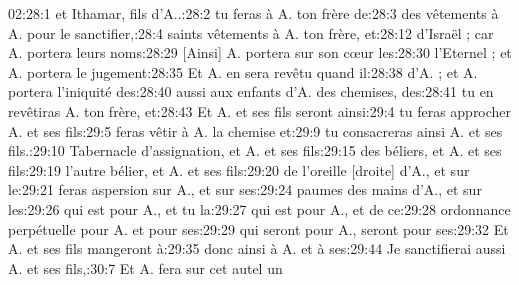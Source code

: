 \begin{multicols}{3}
{02:28:1	et Ithamar, fils d'A..:28:2	tu feras à A. ton frère de:28:3	des vêtements à A. pour le sanctifier,:28:4	saints vêtements à A. ton frère, et:28:12	d'Israël ; car A. portera leurs noms:28:29	[Ainsi] A. portera sur son cœur les:28:30	l'Eternel ; et A. portera le jugement:28:35	Et A. en sera revêtu quand il:28:38	d'A. ; et A. portera l'iniquité des:28:40	aussi aux enfants d'A. des chemises, des:28:41	tu en revêtiras A. ton frère, et:28:43	Et A. et ses fils seront ainsi:29:4	tu feras approcher A. et ses fils:29:5	feras vêtir à A. la chemise et:29:9	tu consacreras ainsi A. et ses fils.:29:10	Tabernacle d'assignation, et A. et ses fils:29:15	des béliers, et A. et ses fils:29:19	l'autre bélier, et A. et ses fils:29:20	de l'oreille [droite] d'A., et sur le:29:21	feras aspersion sur A., et sur ses:29:24	paumes des mains d'A., et sur les:29:26	qui est pour A., et tu la:29:27	qui est pour A., et de ce:29:28	ordonnance perpétuelle pour A. et pour ses:29:29	qui seront pour A., seront pour ses:29:32	Et A. et ses fils mangeront à:29:35	donc ainsi à A. et à ses:29:44	Je sanctifierai aussi A. et ses fils,:30:7	Et A. fera sur cet autel un\newline
}
\end{multicols}
